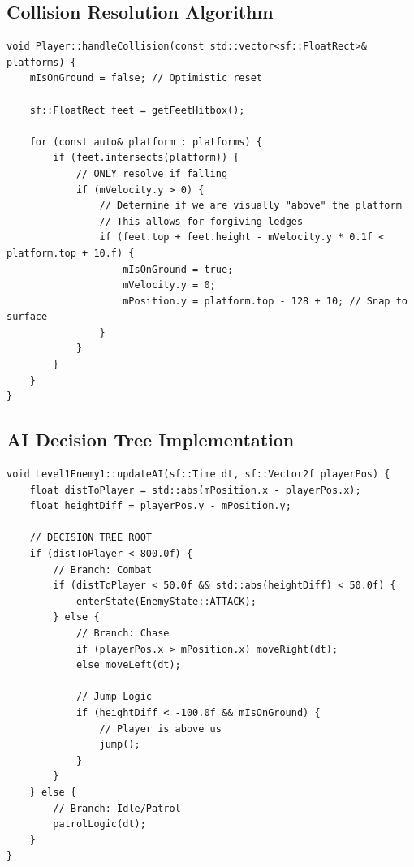 \documentclass[10pt, a4paper]{article}
\begin{document}
\subsection{Collision Resolution Algorithm}
\begin{lstlisting}[caption={Implementation of AABB Collision Resolution}]
void Player::handleCollision(const std::vector<sf::FloatRect>& platforms) {
    mIsOnGround = false; // Optimistic reset
    
    sf::FloatRect feet = getFeetHitbox();
    
    for (const auto& platform : platforms) {
        if (feet.intersects(platform)) {
            // ONLY resolve if falling
            if (mVelocity.y > 0) {
                // Determine if we are visually "above" the platform
                // This allows for forgiving ledges
                if (feet.top + feet.height - mVelocity.y * 0.1f < platform.top + 10.f) {
                    mIsOnGround = true;
                    mVelocity.y = 0;
                    mPosition.y = platform.top - 128 + 10; // Snap to surface
                }
            }
        }
    }
}
\end{lstlisting}

\subsection{AI Decision Tree Implementation}
\begin{lstlisting}[caption={Level 1 Enemy Logic}]
void Level1Enemy1::updateAI(sf::Time dt, sf::Vector2f playerPos) {
    float distToPlayer = std::abs(mPosition.x - playerPos.x);
    float heightDiff = playerPos.y - mPosition.y;

    // DECISION TREE ROOT
    if (distToPlayer < 800.0f) {
        // Branch: Combat
        if (distToPlayer < 50.0f && std::abs(heightDiff) < 50.0f) {
            enterState(EnemyState::ATTACK);
        } else {
            // Branch: Chase
            if (playerPos.x > mPosition.x) moveRight(dt);
            else moveLeft(dt);
            
            // Jump Logic
            if (heightDiff < -100.0f && mIsOnGround) {
                // Player is above us
                jump();
            }
        }
    } else {
        // Branch: Idle/Patrol
        patrolLogic(dt);
    }
}
\end{lstlisting}





\setcounter{section}{4}
\end{document}
